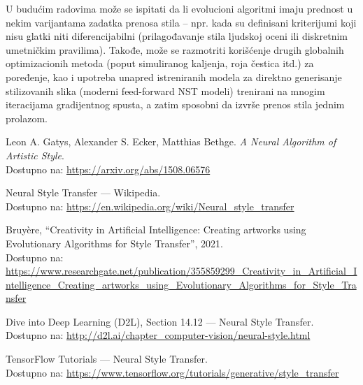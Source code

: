 \documentclass[a4paper,12pt]{article}
\begin{document}
U budućim radovima može se ispitati da li evolucioni algoritmi imaju prednost u nekim varijantama zadatka prenosa stila – npr. kada su definisani kriterijumi koji nisu glatki niti diferencijabilni (prilagođavanje stila ljudskoj oceni ili diskretnim umetničkim pravilima). Takođe, može se razmotriti korišćenje drugih globalnih optimizacionih metoda (poput simuliranog kaljenja, roja čestica itd.) za poređenje, kao i upotreba unapred istreniranih modela za direktno generisanje stilizovanih slika (moderni feed-forward NST modeli) trenirani na mnogim iteracijama gradijentnog spusta, a zatim sposobni da izvrše prenos stila jednim prolazom.

\newpage

\begin{thebibliography}{99}

Leon A. Gatys, Alexander S. Ecker, Matthias Bethge. 
\textit{A Neural Algorithm of Artistic Style}.\\
Dostupno na: \href{https://arxiv.org/abs/1508.06576}{https://arxiv.org/abs/1508.06576}

Neural Style Transfer — Wikipedia.\\
Dostupno na: \href{https://en.wikipedia.org/wiki/Neural_style_transfer}{https://en.wikipedia.org/wiki/Neural\_style\_transfer}

Bruyère, “Creativity in Artificial Intelligence: Creating artworks using Evolutionary Algorithms for Style Transfer”, 2021.\\
Dostupno na: \href{https://www.researchgate.net/publication/355859299_Creativity_in_Artificial_Intelligence_Creating_artworks_using_Evolutionary_Algorithms_for_Style_Transfer}{https://www.researchgate.net/publication/355859299\_Creativity\_in\_Artificial\_Intelligence\_Creating\_artworks\_using\_Evolutionary\_Algorithms\_for\_Style\_Transfer}

Dive into Deep Learning (D2L), Section 14.12 — Neural Style Transfer.\\
Dostupno na: \href{http://d2l.ai/chapter_computer-vision/neural-style.html}{http://d2l.ai/chapter\_computer-vision/neural-style.html}

TensorFlow Tutorials — Neural Style Transfer.\\
Dostupno na: \href{https://www.tensorflow.org/tutorials/generative/style_transfer}{https://www.tensorflow.org/tutorials/generative/style\_transfer}

\end{thebibliography}
\end{document}
